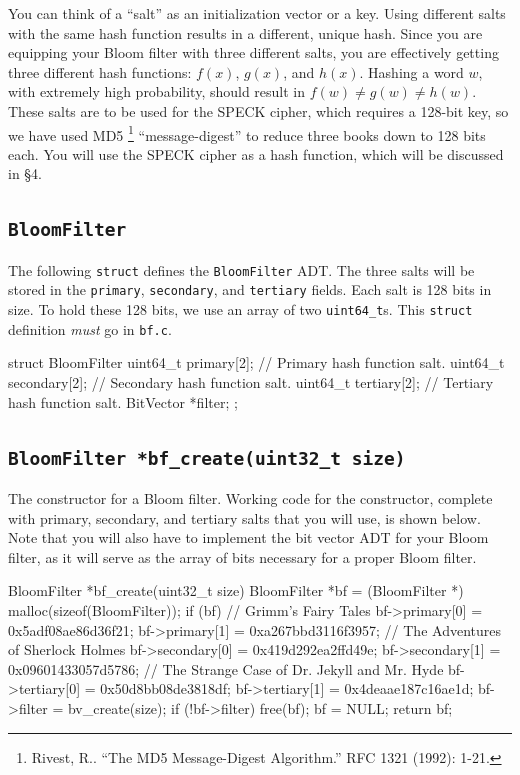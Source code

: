\documentclass{article}
\begin{document}
You can think of a ``salt'' as an initialization vector or a key. Using
different salts with the same hash function results in a different,
unique hash. Since you are equipping your Bloom filter with three
different salts, you are effectively getting three different hash
functions: $f(x)$, $g(x)$, and $h(x)$. Hashing a word $w$, with
extremely high probability, should result in $f(w) \ne g(w) \ne h(w)$.
These salts are to be used for the SPECK cipher, which requires a
128-bit key, so we have used MD5 \footnote{Rivest, R.. “The MD5
  Message-Digest Algorithm.” RFC 1321 (1992): 1-21.} ``message-digest''
  to reduce three books down to 128 bits each. You will use the SPECK
  cipher as a hash function, which will be discussed in \S 4.

\subsection{\texttt{BloomFilter}}

The following \texttt{struct} defines the \texttt{BloomFilter} ADT. The
three salts will be stored in the \texttt{primary}, \texttt{secondary},
and \texttt{tertiary} fields. Each salt is 128 bits in size. To hold
these 128 bits, we use an array of two \texttt{uint64\_t}s. This
\texttt{struct} definition \emph{must} go in \texttt{bf.c}.

\begin{codelisting}{}
struct BloomFilter {
  uint64_t primary[2];   // Primary hash function salt.
  uint64_t secondary[2]; // Secondary hash function salt.
  uint64_t tertiary[2];  // Tertiary hash function salt.
  BitVector *filter;
};
\end{codelisting}

\subsection{\texttt{BloomFilter *bf\_create(uint32\_t size)}}

The constructor for a Bloom filter. Working code for the constructor,
complete with primary, secondary, and tertiary salts that you will use,
is shown below. Note that you will also have to implement the bit vector
ADT for your Bloom filter, as it will serve as the array of bits
necessary for a proper Bloom filter.

\begin{codelisting}{}
BloomFilter *bf_create(uint32_t size) {
  BloomFilter *bf = (BloomFilter *) malloc(sizeof(BloomFilter));
  if (bf) {
    // Grimm's Fairy Tales
    bf->primary[0] = 0x5adf08ae86d36f21;
    bf->primary[1] = 0xa267bbd3116f3957;
    // The Adventures of Sherlock Holmes
    bf->secondary[0] = 0x419d292ea2ffd49e;
    bf->secondary[1] = 0x09601433057d5786;
    // The Strange Case of Dr. Jekyll and Mr. Hyde
    bf->tertiary[0] = 0x50d8bb08de3818df;
    bf->tertiary[1] = 0x4deaae187c16ae1d;
    bf->filter = bv_create(size);
    if (!bf->filter) {
      free(bf);
      bf = NULL;
    }
  }
  return bf;
}
\end{codelisting}
\end{document}
